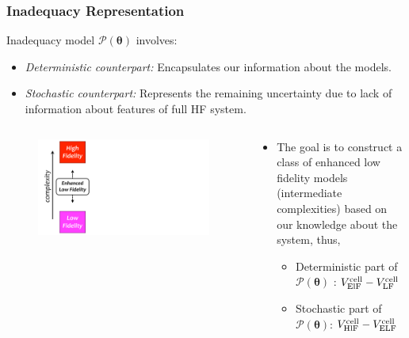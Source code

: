 \documentclass[10pt,xcolor=dvipsnames,compress]{beamer}
\begin{document}
\begin{frame}
\frametitle{Inadequacy Representation}
\vfill


Inadequacy model $\mathcal{P}(\boldsymbol{\theta})$ involves:
\begin{itemize}
\item \textit{Deterministic counterpart:}
Encapsulates our information about the models.

\item \textit{Stochastic counterpart:}
Represents the remaining uncertainty due to lack of information about features of full HF system.
\end{itemize}

\begin{columns}
\begin{figure}[h]
    \centering
    \includegraphics[trim = 0.in 0.in 9.in 0in, clip, width=1\textwidth]{figs/ELFmodel.pdf} 
\end{figure}


\begin{block}{}

\begin{itemize}
\item The goal is to construct a class of enhanced low fidelity models (intermediate complexities) based on our knowledge about the system, thus,

\begin{itemize}
\item Deterministic part of $\mathcal{P}(\boldsymbol{\theta})$ :
$V^{\rm cell}_{\rm ElF} -  V^{\rm cell}_{\rm LF}$
\item Stochastic part of $\mathcal{P}(\boldsymbol{\theta})$: 
$V^{\rm cell}_{\rm HlF} -  V^{\rm cell}_{\rm ELF}$
\end{itemize}



\end{itemize}
\end{block}
\end{columns}
\end{frame}
\end{document}
